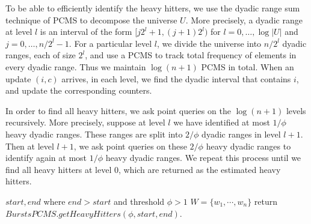 To be able to efficiently identify the heavy hitters,
we use the dyadic range sum technique of PCMS to decompose
the universe $U$. More precisely, a dyadic range at level $l$
is an interval of the form $[j2^l+1, (j+1)2^l)$ for $l=0, \dots, \log|U|$
and $j=0, \dots, n/2^l-1$. For a particular level $l$, we divide the universe
into $n/2^l$ dyadic ranges, each of size $2^l$, and use a PCMS to
track total frequency of elements in every
dyadic range. Thus we maintain $\log(n+1)$ PCMS in total.
 When an update $(i, c)$ arrives, in each level, we
find the dyadic interval that contains $i$, and update the corresponding
counters.

In order to find all heavy hitters, we ask point queries on the
$\log(n + 1)$ levels recursively. More precisely, suppose at level $l$ we
have identified at most $1/\phi$ heavy dyadic ranges. These ranges are split into $2/\phi$
dyadic ranges in level $l+1$. Then at level $l+1$, we ask point queries on these
$2/\phi$ heavy dyadic ranges to identify again at most $1/\phi$ heavy dyadic
ranges. We repeat this process until we find all heavy hitters at
level 0, which are returned as the estimated heavy hitters.

\begin{algorithm}
        \caption{\emph{$\mathbb{Q}2_{[start,end],\phi}$ }}
        \label{algo:hhapproach1}
\begin{algorithmic} 
\REQUIRE $start, end$ where $end > start$ and threshold $\phi>1$
    \ENSURE $W=\{w_1, \cdots, w_n\}$
\STATE
\STATE return $BurstsPCMS.getHeavyHitters(\phi, start, end)$.
\end{algorithmic}
\end{algorithm}



